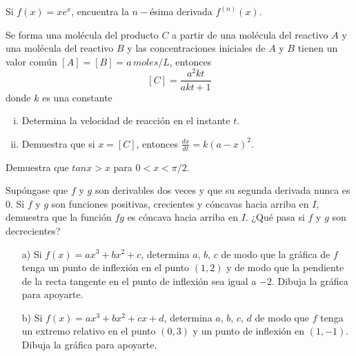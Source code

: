\documentclass[10pt]{exam}
\begin{document}
\begin{questions}
    \question Si $f(x)=xe^x$, encuentra la $n-$ésima derivada $f^{(n)}(x)$.
    
    
    \question   Se forma una molécula del producto $C$ a partir de una molécula del reactivo $A$ y una molécula del reactivo $B$ y las concentraciones iniciales de $A$ y $B$ tienen un valor común $[A]=[B]=a\,moles/L$, entonces
    $$[C]=\frac{a^2kt}{akt+1}$$
    donde $k$ es una constante
    \begin{enumerate}[i)]
        \item Determina la velocidad de reacción en el instante $t$.
        \item Demuestra que si $x=[C]$, entonces $\frac{dx}{dt}=k(a-x)^2$.
    \end{enumerate}{}
    
 \vskip 10pt
\normalsize

    

\question Demuestra que $tanx>x$ para $0<x<\pi/2$.

\question Supóngase que $f$ y $g$ son derivables dos veces y
que su segunda derivada nunca es 0. Si $f$ y $g$ son funciones positivas, crecientes y cóncavas hacia arriba en $I$, demuestra que la función $fg$ es cóncava hacia arriba en $I$. ¿Qué pasa si $f$ y $g$ son decrecientes?

\question \begin{itemize}
    \item [a)] Si $f(x)=ax^3+bx^2+c$, determina $a$, $b$, $c$ de modo que la gráfica de $f$ tenga un punto de inflexión en el punto $(1,2)$ y de modo que la pendiente de la recta tangente en el punto de inflexión sea igual a $-2$. Dibuja la gráfica para apoyarte.
    \item [b)] Si $f(x)=ax^3+bx^2+cx+d$, determina $a$, $b$, $c$, $d$ de modo que $f$ tenga un extremo relativo en el punto $(0,3)$ y un punto de inflexión en $(1,-1)$. Dibuja la gráfica para apoyarte.
\end{itemize}


\end{questions}
\end{document}
